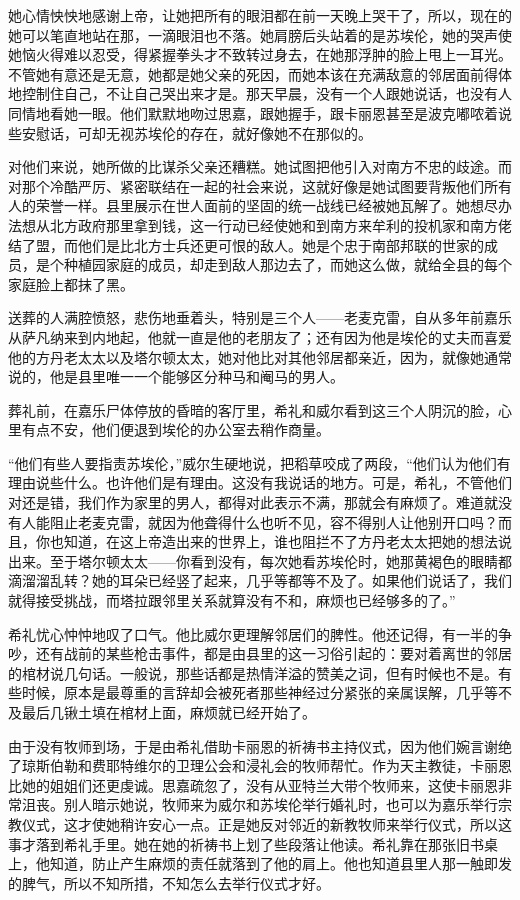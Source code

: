 \par 她心情怏怏地感谢上帝，让她把所有的眼泪都在前一天晚上哭干了，所以，现在的她可以笔直地站在那，一滴眼泪也不落。她肩膀后头站着的是苏埃伦，她的哭声使她恼火得难以忍受，得紧握拳头才不致转过身去，在她那浮肿的脸上甩上一耳光。不管她有意还是无意，她都是她父亲的死因，而她本该在充满敌意的邻居面前得体地控制住自己，不让自己哭出来才是。那天早晨，没有一个人跟她说话，也没有人同情地看她一眼。他们默默地吻过思嘉，跟她握手，跟卡丽恩甚至是波克嘟哝着说些安慰话，可却无视苏埃伦的存在，就好像她不在那似的。
\par 对他们来说，她所做的比谋杀父亲还糟糕。她试图把他引入对南方不忠的歧途。而对那个冷酷严厉、紧密联结在一起的社会来说，这就好像是她试图要背叛他们所有人的荣誉一样。县里展示在世人面前的坚固的统一战线已经被她瓦解了。她想尽办法想从北方政府那里拿到钱，这一行动已经使她和到南方来牟利的投机家和南方佬结了盟，而他们是比北方士兵还更可恨的敌人。她是个忠于南部邦联的世家的成员，是个种植园家庭的成员，却走到敌人那边去了，而她这么做，就给全县的每个家庭脸上都抹了黑。
\par 送葬的人满腔愤怒，悲伤地垂着头，特别是三个人——老麦克雷，自从多年前嘉乐从萨凡纳来到内地起，他就一直是他的老朋友了；还有因为他是埃伦的丈夫而喜爱他的方丹老太太以及塔尔顿太太，她对他比对其他邻居都亲近，因为，就像她通常说的，他是县里唯一一个能够区分种马和阉马的男人。
\par 葬礼前，在嘉乐尸体停放的昏暗的客厅里，希礼和威尔看到这三个人阴沉的脸，心里有点不安，他们便退到埃伦的办公室去稍作商量。
\par “他们有些人要指责苏埃伦，”威尔生硬地说，把稻草咬成了两段，“他们认为他们有理由说些什么。也许他们是有理由。这没有我说话的地方。可是，希礼，不管他们对还是错，我们作为家里的男人，都得对此表示不满，那就会有麻烦了。难道就没有人能阻止老麦克雷，就因为他聋得什么也听不见，容不得别人让他别开口吗？而且，你也知道，在这上帝造出来的世界上，谁也阻拦不了方丹老太太把她的想法说出来。至于塔尔顿太太——你看到没有，每次她看苏埃伦时，她那黄褐色的眼睛都滴溜溜乱转？她的耳朵已经竖了起来，几乎等都等不及了。如果他们说话了，我们就得接受挑战，而塔拉跟邻里关系就算没有不和，麻烦也已经够多的了。”
\par 希礼忧心忡忡地叹了口气。他比威尔更理解邻居们的脾性。他还记得，有一半的争吵，还有战前的某些枪击事件，都是由县里的这一习俗引起的：要对着离世的邻居的棺材说几句话。一般说，那些话都是热情洋溢的赞美之词，但有时候也不是。有些时候，原本是最尊重的言辞却会被死者那些神经过分紧张的亲属误解，几乎等不及最后几锹土填在棺材上面，麻烦就已经开始了。
\par 由于没有牧师到场，于是由希礼借助卡丽恩的祈祷书主持仪式，因为他们婉言谢绝了琼斯伯勒和费耶特维尔的卫理公会和浸礼会的牧师帮忙。作为天主教徒，卡丽恩比她的姐姐们还更虔诚。思嘉疏忽了，没有从亚特兰大带个牧师来，这使卡丽恩非常沮丧。别人暗示她说，牧师来为威尔和苏埃伦举行婚礼时，也可以为嘉乐举行宗教仪式，这才使她稍许安心一点。正是她反对邻近的新教牧师来举行仪式，所以这事才落到希礼手里。她在她的祈祷书上划了些段落让他读。希礼靠在那张旧书桌上，他知道，防止产生麻烦的责任就落到了他的肩上。他也知道县里人那一触即发的脾气，所以不知所措，不知怎么去举行仪式才好。
